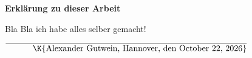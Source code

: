 \thispagestyle{empty}

\begin{large}
\null\vspace{6cm}
\textbf{Erklärung zu dieser Arbeit}
\end{large}
\null\vfill
\begin{flushleft}

	Bla Bla ich habe alles selber gemacht!

		$\overline{\parbox{10cm}{\hfill\K{Alexander Gutwein, Hannover, den \today}}}$

\vspace{12pt}
\end{flushleft}
\null\vfill